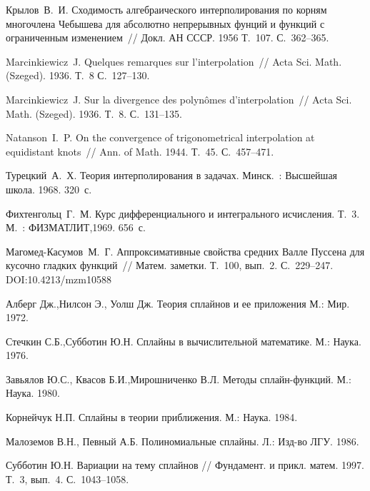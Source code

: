\begin{thebibliography}{1}
{Крылов~В.~И.} Сходимость алгебраического интерполирования по корням многочлена Чебышева для абсолютно непрерывных фунций и функций с ограниченным изменением~// Докл. АН СССР. 1956 Т.~107. С.~362--365.

{Marcinkiewicz~J.} Quelques remarques sur l'interpolation~// Acta Sci. Math. (Szeged). 1936. Т.~8 С.~127--130.

{Marcinkiewicz~J.} Sur la divergence des polyn{\^o}mes d'interpolation~// Acta Sci. Math. (Szeged). 1936. Т.~8. С.~131--135.

{Natanson~I.~P.} On the convergence of trigonometrical interpolation at equidistant knots~// Ann. of Math. 1944. Т.~45. С.~457--471.


{Турецкий~А.~Х.} Теория интерполирования в задачах. Минск.~: Высшейшая школа. 1968. 320~с.


{Фихтенгольц~Г.~М.} Курс дифференциального и интегрального исчисления. Т.~3. М.~:
ФИЗМАТЛИТ,1969. 656~с.

{Магомед-Касумов~М.~Г.} Аппроксимативные свойства средних Валле Пуссена для кусочно гладких функций~// Матем. заметки. Т.~100, вып.~2. С.~229--247.
DOI:10.4213/mzm10588


 Алберг Дж.,Нилсон Э., Уолш Дж. Теория сплайнов и ее приложения М.: Мир. 1972.

Стечкин С.Б.,Субботин Ю.Н. Сплайны в вычислительной математике. М.: Наука. 1976.

Завьялов Ю.С., Квасов Б.И.,Мирошниченко В.Л. Методы сплайн-функций. М.: Наука. 1980.


Корнейчук Н.П. Сплайны в теории приближения. М.: Наука. 1984.


Малоземов В.Н., Певный А.Б. Полиномиальные сплайны. Л.: Изд-во ЛГУ. 1986.

 {Субботин Ю.Н.} Вариации на тему сплайнов // Фундамент. и прикл. матем.
 1997. Т.~3, вып.~4. С.~1043--1058.



\end{thebibliography}
